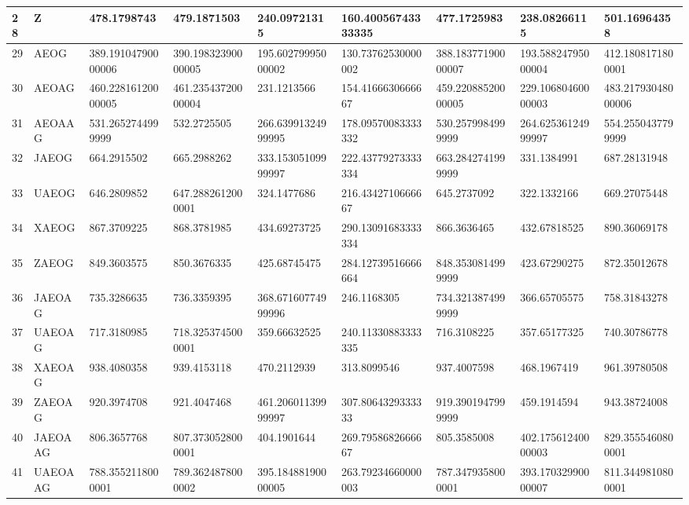 {\begin{longtable}{|l|l|l|l|l|l|l|l|l|}
        28 & Z & 478.1798743 & 479.1871503 & 240.09721315 & 160.40056743333335 & 477.1725983 & 238.08266115 & 501.16964358 \\ \hline
        29 & AEOG & 389.19104790000006 & 390.19832390000005 & 195.60279995000002 & 130.73762530000002 & 388.18377190000007 & 193.58824795000004 & 412.1808171800001 \\ \hline
        30 & AEOAG & 460.22816120000005 & 461.23543720000004 & 231.1213566 & 154.4166630666667 & 459.22088520000005 & 229.10680460000003 & 483.21793048000006 \\ \hline
        31 & AEOAAG & 531.2652744999999 & 532.2725505 & 266.63991324999995 & 178.09570083333332 & 530.2579984999999 & 264.62536124999997 & 554.2550437799999 \\ \hline
        32 & JAEOG & 664.2915502 & 665.2988262 & 333.15305109999997 & 222.43779273333334 & 663.2842741999999 & 331.1384991 & 687.28131948 \\ \hline
        33 & UAEOG & 646.2809852 & 647.2882612000001 & 324.1477686 & 216.4342710666667 & 645.2737092 & 322.1332166 & 669.27075448 \\ \hline
        34 & XAEOG & 867.3709225 & 868.3781985 & 434.69273725 & 290.13091683333334 & 866.3636465 & 432.67818525 & 890.36069178 \\ \hline
        35 & ZAEOG & 849.3603575 & 850.3676335 & 425.68745475 & 284.12739516666664 & 848.3530814999999 & 423.67290275 & 872.35012678 \\ \hline
        36 & JAEOAG & 735.3286635 & 736.3359395 & 368.67160774999996 & 246.1168305 & 734.3213874999999 & 366.65705575 & 758.31843278 \\ \hline
        37 & UAEOAG & 717.3180985 & 718.3253745000001 & 359.66632525 & 240.11330883333335 & 716.3108225 & 357.65177325 & 740.30786778 \\ \hline
        38 & XAEOAG & 938.4080358 & 939.4153118 & 470.2112939 & 313.8099546 & 937.4007598 & 468.1967419 & 961.39780508 \\ \hline
        39 & ZAEOAG & 920.3974708 & 921.4047468 & 461.20601139999997 & 307.8064329333333 & 919.3901947999999 & 459.1914594 & 943.38724008 \\ \hline
        40 & JAEOAAG & 806.3657768 & 807.3730528000001 & 404.1901644 & 269.7958682666667 & 805.3585008 & 402.17561240000003 & 829.3555460800001 \\ \hline
        41 & UAEOAAG & 788.3552118000001 & 789.3624878000002 & 395.18488190000005 & 263.79234660000003 & 787.3479358000001 & 393.17032990000007 & 811.3449810800001 \\ \hline

\end{longtable}}
